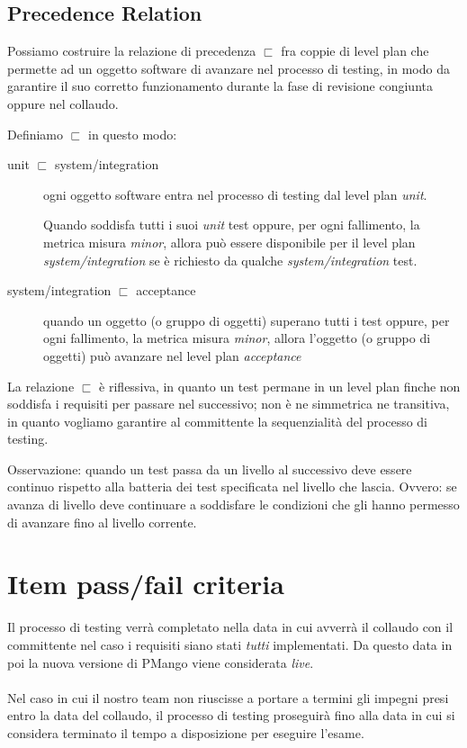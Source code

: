 \subsection{Precedence Relation}
Possiamo costruire la relazione di precedenza $\sqsubset$ fra coppie di level
plan che permette ad un oggetto software di avanzare nel processo di testing,
in modo da garantire il suo corretto funzionamento durante la fase di
revisione congiunta oppure nel collaudo. 

Definiamo $\sqsubset$ in questo modo: 
\begin{description}
  \item[unit $\sqsubset$ system/integration] ogni oggetto software entra nel 
processo di testing dal level plan \emph{unit}. 

Quando soddisfa tutti i suoi \emph{unit} test oppure, per ogni fallimento, la
metrica misura \emph{minor}, allora pu\`o essere disponibile per il level plan 
\emph{system/integration} se \`e richiesto da qualche \emph{system/integration}
test.
  \item[system/integration $\sqsubset$ acceptance] quando un oggetto (o gruppo
  di oggetti) superano tutti i test oppure, per ogni fallimento, la metrica 
  misura \emph{minor}, allora l'oggetto (o gruppo di oggetti) pu\`o avanzare
  nel level plan \emph{acceptance}
\end{description}
La relazione $\sqsubset$ \`e riflessiva, in quanto un test permane in un level
plan finche non soddisfa i requisiti per passare nel successivo; non \`e ne
simmetrica ne transitiva, in quanto vogliamo garantire al committente la
sequenzialit\`a del processo di testing.

Osservazione: quando un test passa da un livello al successivo deve essere
continuo rispetto alla batteria dei test specificata nel livello che lascia.
Ovvero: se avanza di livello deve continuare a soddisfare le condizioni che gli
hanno permesso di avanzare fino al livello corrente.



\section{Item pass/fail criteria}
Il processo di testing verr\`a completato nella data in cui avverr\`a il
collaudo con il committente nel caso i requisiti siano stati \emph{tutti}
implementati. Da questo data in poi la nuova versione di PMango viene
considerata \emph{live}. \\ \\
Nel caso in cui il nostro team non riuscisse a portare a termini
gli impegni presi entro la data del collaudo, il processo di testing
proseguir\`a fino alla data in cui si considera terminato il tempo a 
disposizione per eseguire l'esame.

